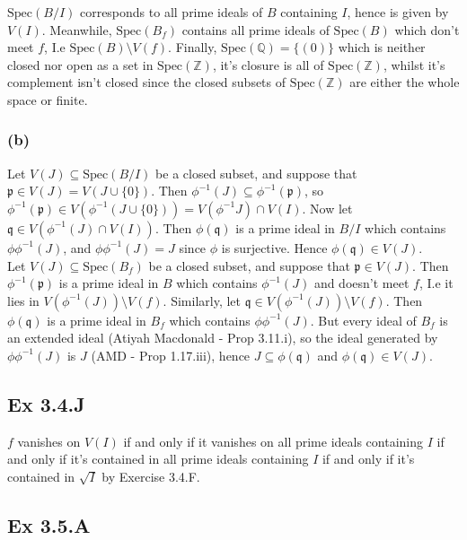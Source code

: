 \documentclass{article}
\theoremstyle{definition}
\newcommand{\Z}{\mathbb{Z}}
\newcommand{\Q}{\mathbb{Q}}
\newcommand{\Spec}{\text{Spec}}
\begin{document}
$\Spec(B/I)$ corresponds to all prime ideals of $B$ containing $I$, hence is
given by $V(I)$. Meanwhile, $\Spec(B_f)$ contains all prime ideals of
$\Spec(B)$ which don't meet $f$, I.e $\Spec(B) \setminus V(f)$. Finally,
$\Spec(\Q) = \{(0)\}$ which is neither closed nor open as a set in $\Spec(\Z)$,
it's closure is all of $\Spec(\Z)$, whilst it's complement isn't closed since
the closed subsets of $\Spec(\Z)$ are either the whole space or finite.

\subsubsection*{(b)}

Let $V(J) \subseteq \Spec(B/I)$ be a closed subset, and suppose that
$\mathfrak{p} \in V(J) = V(J \cup \{0\})$. Then $\phi^{-1}(J) \subseteq
\phi^{-1}(\mathfrak{p})$, so $\phi^{-1}(\mathfrak{p}) \in V(\phi^{-1}(J \cup
\{0\})) = V(\phi^{-1}J) \cap V(I)$. Now let $\mathfrak{q} \in V(\phi^{-1}(J)
\cap V(I))$. Then $\phi(\mathfrak{q})$ is a prime ideal in $B/I$ which contains
$\phi\phi^{-1}(J)$, and $\phi\phi^{-1}(J) = J$ since $\phi$ is surjective. Hence 
$\phi(\mathfrak{q}) \in V(J)$. \\

Let $V(J) \subseteq \Spec(B_f)$ be a closed subset, and suppose that
$\mathfrak{p} \in V(J)$. Then $\phi^{-1}(\mathfrak{p})$ is a prime ideal in $B$
which contains $\phi^{-1}(J)$ and doesn't meet $f$, I.e it lies in
$V(\phi^{-1}(J)) \setminus V(f)$. Similarly, let $\mathfrak{q} \in
V(\phi^{-1}(J)) \setminus V(f)$. Then $\phi(\mathfrak{q})$ is a prime ideal in
$B_f$ which contains $\phi\phi^{-1}(J)$. But every ideal of $B_f$ is an
extended ideal (Atiyah Macdonald - Prop 3.11.i), so the ideal generated by
$\phi\phi^{-1}(J)$ is $J$ (AMD - Prop 1.17.iii), hence $J \subseteq
\phi(\mathfrak{q})$ and $\phi(\mathfrak{q}) \in V(J)$.

\subsection*{Ex 3.4.J}

$f$ vanishes on $V(I)$ if and only if it vanishes on all prime ideals
containing $I$ if and only if it's contained in all prime ideals containing $I$
if and only if it's contained in $\sqrt{I}$ by Exercise 3.4.F.

\subsection*{Ex 3.5.A}
\end{document}
